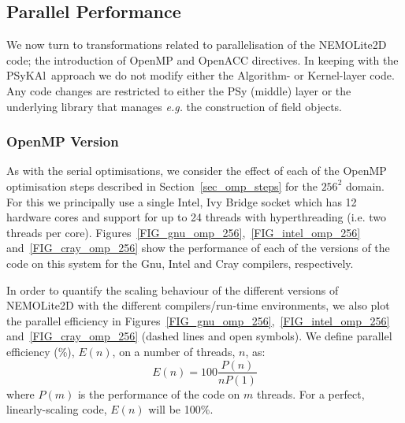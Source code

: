 \documentclass[journal]{IEEEtran}
\newcommand{\psykal}{{PS}y{KA}l}
\begin{document}
%
%



\subsection{Parallel Performance}

We now turn to transformations related to parallelisation of the
NEMOLite2D code; the introduction of OpenMP and OpenACC directives. In
keeping with the \psykal\ approach we do not modify either the
Algorithm- or Kernel-layer code.  Any code changes are restricted to
either the PSy (middle) layer or the underlying library that manages
{\it e.g.} the construction of field objects.

\subsubsection{OpenMP Version}

As with the serial optimisations, we consider the effect of each of
the OpenMP optimisation steps described in Section~\ref{sec_omp_steps}
for the $256^2$ domain. For this we principally use a single Intel,
Ivy Bridge socket which has 12 hardware cores and support for up to 24
threads with hyperthreading (i.e. two threads per core).
Figures~\ref{FIG_gnu_omp_256},~\ref{FIG_intel_omp_256}
and~\ref{FIG_cray_omp_256} show the performance of each of the
versions of the code on this system for the Gnu, Intel and Cray
compilers, respectively.

In order to quantify the scaling behaviour of the different versions
of NEMOLite2D with the different compilers/run-time environments, we
also plot the parallel efficiency in
Figures~\ref{FIG_gnu_omp_256},~\ref{FIG_intel_omp_256}
and~\ref{FIG_cray_omp_256} (dashed lines and open symbols). We define
parallel efficiency (\%), $E(n)$, on a number of threads, $n$, as:
\[
E(n) = 100  \frac{P(n)}{ n P(1)}
\]
where $P(m)$ is the performance of the code on $m$ threads. For a
perfect, linearly-scaling code, $E(n)$ will be 100\%.
\end{document}
